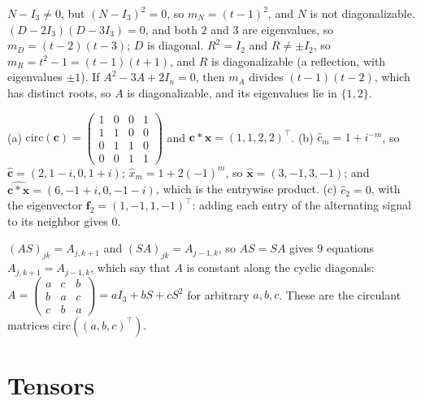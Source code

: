 \documentclass[11pt]{article}
\begin{document}
\begin{description}[leftmargin=0pt, itemsep=0.3em]
    \item[\ref{pr:minimal-poly}.] $N - I_3 \neq 0$, but $(N - I_3)^2 = 0$, so $m_N = (t - 1)^2$, and $N$ is not diagonalizable. $(D - 2I_3)(D - 3I_3) = 0$, and both $2$ and $3$ are eigenvalues, so $m_D = (t - 2)(t - 3)$; $D$ is diagonal. $R^2 = I_2$ and $R \neq \pm I_2$, so $m_R = t^2 - 1 = (t - 1)(t + 1)$, and $R$ is diagonalizable (a reflection, with eigenvalues $\pm 1$). If $A^2 - 3A + 2I_n = 0$, then $m_A$ divides $(t - 1)(t - 2)$, which has distinct roots, so $A$ is diagonalizable, and its eigenvalues lie in $\{1, 2\}$.
    \item[\ref{pr:circulant}.] (a) $\mathrm{circ}(\mathbf{c}) = \begin{pmatrix} 1 & 0 & 0 & 1 \\ 1 & 1 & 0 & 0 \\ 0 & 1 & 1 & 0 \\ 0 & 0 & 1 & 1 \end{pmatrix}$ and $\mathbf{c} \ast \mathbf{x} = (1, 1, 2, 2)^\top$. (b) $\hat{c}_m = 1 + i^{-m}$, so $\hat{\mathbf{c}} = (2, 1 - i, 0, 1 + i)$; $\hat{x}_m = 1 + 2(-1)^m$, so $\hat{\mathbf{x}} = (3, -1, 3, -1)$; and $\widehat{\mathbf{c} \ast \mathbf{x}} = (6, -1 + i, 0, -1 - i)$, which is the entrywise product. (c) $\hat{c}_2 = 0$, with the eigenvector $\mathbf{f}_2 = (1, -1, 1, -1)^\top$: adding each entry of the alternating signal to its neighbor gives $0$.
    \item[\ref{pr:shift-commute}.] $(AS)_{jk} = A_{j,k+1}$ and $(SA)_{jk} = A_{j-1,k}$, so $AS = SA$ gives $9$ equations $A_{j,k+1} = A_{j-1,k}$, which say that $A$ is constant along the cyclic diagonals: $A = \begin{pmatrix} a & c & b \\ b & a & c \\ c & b & a \end{pmatrix} = aI_3 + bS + cS^2$ for arbitrary $a, b, c$. These are the circulant matrices $\mathrm{circ}((a, b, c)^\top)$.
\end{description}

\section*{Tensors}
\end{document}
